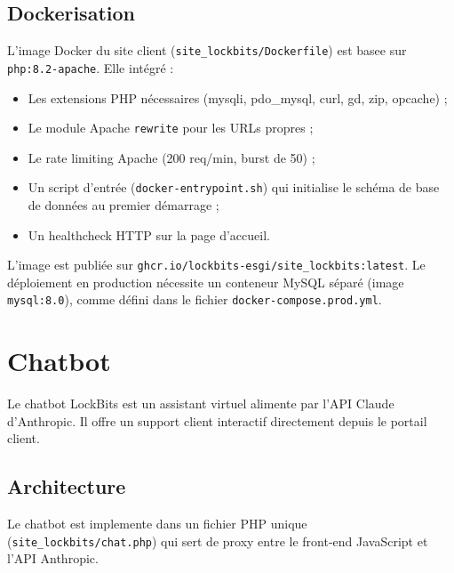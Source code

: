 \subsection{Dockerisation}

L'image Docker du site client (\texttt{site\_lockbits/Dockerfile}) est
basee sur \texttt{php:8.2-apache}. Elle intégré :

\begin{itemize}
  \item Les extensions PHP nécessaires (mysqli, pdo\_mysql, curl, gd,
    zip, opcache) ;
  \item Le module Apache \texttt{rewrite} pour les URLs propres ;
  \item Le rate limiting Apache (200 req/min, burst de 50) ;
  \item Un script d'entrée (\texttt{docker-entrypoint.sh}) qui
    initialise le schéma de base de données au premier démarrage ;
  \item Un healthcheck HTTP sur la page d'accueil.
\end{itemize}

L'image est publiée sur \texttt{ghcr.io/lockbits-esgi/site\_lockbits:latest}.
Le déploiement en production nécessite un conteneur MySQL séparé (image
\texttt{mysql:8.0}), comme défini dans le fichier
\texttt{docker-compose.prod.yml}.


\section{Chatbot}

Le chatbot LockBits est un assistant virtuel alimente par l'API Claude
d'Anthropic. Il offre un support client interactif directement depuis
le portail client.

\subsection{Architecture}

Le chatbot est implemente dans un fichier PHP unique
(\texttt{site\_lockbits/chat.php}) qui sert de proxy entre le front-end
JavaScript et l'API Anthropic.

